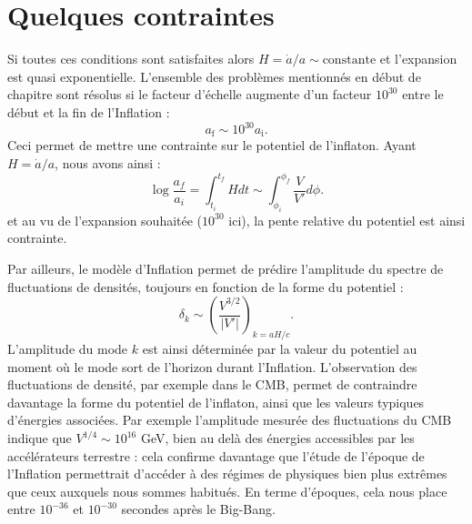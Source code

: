 \section{Quelques contraintes}
Si toutes ces conditions sont satisfaites alors $H=\dot a /a \sim \mathrm{constante}$ et l'expansion est quasi exponentielle. L'ensemble des problèmes mentionnés en début de chapitre sont résolus si le facteur d'échelle augmente d'un facteur $10^{30}$ entre le début et la fin de l'Inflation :
\begin{equation}
a_\mathrm{f}\sim 10^{30} a_\mathrm{i}.
\end{equation}
Ceci permet de mettre une contrainte sur le potentiel de l'inflaton. Ayant $H=\dot a/a$, nous avons ainsi :
\begin{equation}
\log \frac{a_f}{a_i}=\int_{t_i}^{t_f} H dt \sim \int_{\phi_i}^{\phi_f}\frac{V}{V'}d \phi.
\end{equation}
et au vu de l'expansion souhaitée ($10^{30}$ ici), la pente relative du potentiel est ainsi contrainte.

Par ailleurs, le modèle d'Inflation permet de prédire l'amplitude du spectre de fluctuations de densités, toujours en fonction de la forme du potentiel :
\begin{equation}
\delta_k\sim \left(\frac{V^{3/2}}{|V'|}\right)_{k=aH/c}.
\end{equation}
L'amplitude du mode $k$ est ainsi déterminée par la valeur du potentiel au moment où le mode sort de l'horizon durant l'Inflation. L'observation des fluctuations de densité, par exemple dans le CMB, permet de contraindre davantage la forme du potentiel de l'inflaton, ainsi que les valeurs typiques d'énergies associées. Par exemple l'amplitude mesurée des fluctuations du CMB indique que $V^{1/4}\sim 10^{16}$ GeV, bien au delà des énergies accessibles par les accélérateurs terrestre : cela confirme davantage que l'étude de l'époque de l'Inflation permettrait d'accéder à des régimes de physiques bien plus extrêmes que ceux auxquels nous sommes habitués.  En terme d'époques, cela nous place entre $10^{-36}$ et $10^{-30}$ secondes après le Big-Bang. 

